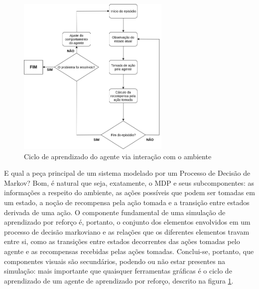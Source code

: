 \documentclass[cic,tc]{iiufrgs}
\begin{document}
\begin{figure}
    \caption{Ciclo de aprendizado do agente via interação com o ambiente}
    \begin{center}
      \includegraphics[width=0.65\textwidth]{fluxo_ar.png}
    \end{center}
    \label{fig:fluxo_ar}
\end{figure}


E qual a peça principal de um sistema modelado por um Processo de Decisão de
Markov? Bom, é natural que seja, exatamente, o MDP e seus subcomponentes:
as informações a respeito do ambiente, as ações possíveis que podem ser tomadas
em um estado, a noção de recompensa pela ação tomada e a transição entre estados
derivada de uma ação. O componente fundamental de uma simulação de aprendizado
por reforço é, portanto, o conjunto dos elementos envolvidos em um processo de
decisão markoviano e as relações que os diferentes elementos travam entre si,
como as transições entre estados decorrentes das ações tomadas pelo agente e as
recompensas recebidas pelas ações tomadas. Conclui-se, portanto, que componentes
visuais são secundários, podendo ou não estar presentes na simulação: mais
importante que quaisquer ferramentas gráficas é o ciclo de aprendizado de um
agente de aprendizado por reforço, descrito na figura \ref{fig:fluxo_ar}.
\end{document}
